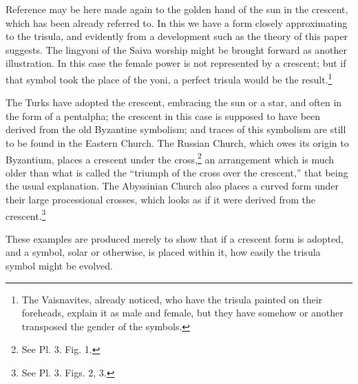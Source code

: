 \documentclass[a4paper, 11pt, oneside, english, landscape, twocolumn]{article}
\begin{document}
Reference may be here made again to the golden hand of the sun in the crescent, which has been already referred to. In this we have a form closely approximating to the trisula, and evidently from a development such as the theory of this paper suggests. The lingyoni of the Saiva worship might be brought forward as another illustration. In this case the female power is not represented by a crescent; but if that symbol took the place of the yoni, a perfect trisula would be the result.\footnote{The Vaisnavites, already noticed, who have the trisula painted on their foreheads, explain it as male and female, but they have somehow or another transposed the gender of the symbols.}

The Turks have adopted the crescent, embracing the sun or a star, and often in the form of a pentalpha; the crescent in this case is supposed to have been derived from the old Byzantine symbolism; and traces of this symbolism are still to be found in the Eastern Church. The Russian Church, which owes its origin to Byzantium, places a crescent under the cross,\footnote{See Pl. 3. Fig. 1.} an arrangement which is much older than what is called the ``triumph of the cross over the crescent,'' that being the usual explanation. The Abyssinian Church also places a curved form under their large processional crosses, which looks as if it were derived from the crescent.\footnote{See Pl. 3. Figs. 2, 3.}

These examples are produced merely to show that if a crescent form is adopted, and a symbol, solar or otherwise, is placed within it, how easily the trisula symbol might be evolved.
\end{document}
